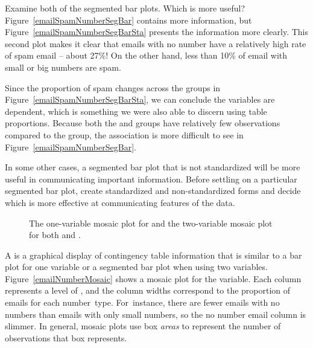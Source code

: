 \begin{example}{Examine both of the segmented bar plots. Which is more useful?}
Figure~\ref{emailSpamNumberSegBar} contains more information, but Figure~\ref{emailSpamNumberSegBarSta} presents the information more clearly. This second plot makes it clear that emails with no number have a relatively high rate of spam email -- about 27\%! On the other hand, less than 10\% of email with small or big numbers are spam.
\end{example}

Since the proportion of spam changes across the groups in Figure~\ref{emailSpamNumberSegBarSta}, we can conclude the variables are dependent, which is something we were also able to discern using table proportions. Because both the  and  groups have relatively few observations compared to the  group, the association is more difficult to see in Figure~\ref{emailSpamNumberSegBar}.

In some other cases, a segmented bar plot that is not standardized will be more useful in communicating important information. Before settling on a particular segmented bar plot, create standardized and non-standardized forms and decide which is more effective at communicating features of the data.

\begin{figure}
\centering
{}
\caption{The one-variable mosaic plot for  and the two-variable mosaic plot for both  and .}
\label{emailSpamNumberMosaicPlot}
\end{figure}

A  is a graphical display of contingency table information that is similar to a bar plot for one variable or a segmented bar plot when using two variables. Figure~\ref{emailNumberMosaic} shows a mosaic plot for the  variable. Each column represents a level of , and the column widths correspond to the proportion of emails for each number~type. For~instance, there are fewer emails with no numbers than emails with only small numbers, so the no number email column is slimmer. In general, mosaic plots use box \emph{areas} to represent the number of observations that box represents.

